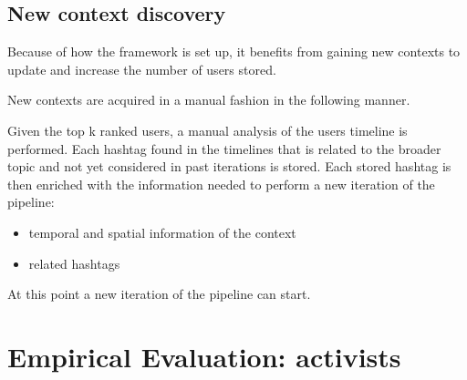 \documentclass[runningheads]{llncs}
\begin{document}
\subsection{New context discovery}  \label{sec:context-discovery}
Because of how the framework is set up, it benefits from gaining new contexts to update and increase the number of users stored.

New contexts are acquired in a manual fashion in the following manner.

Given the top k ranked users, a manual analysis of the users timeline is performed.
Each hashtag found in the timelines that is related to the broader topic and not yet considered in past iterations is stored.
Each stored hashtag is then enriched with the information needed to perform a new iteration of the pipeline:
\begin{itemize}
    \item temporal and spatial information of the context
    \item related hashtags
\end{itemize}

At this point a new iteration of the pipeline can start.

%
%

\section{Empirical Evaluation: activists} \label{sec:evaluation}
\end{document}
